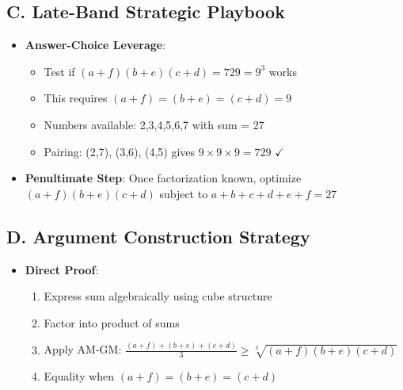 \documentclass[]{article}
\begin{document}
\begin{strategicbox}
\subsection*{C. Late-Band Strategic Playbook}
\begin{itemize}[leftmargin=*]
    \item \textbf{Answer-Choice Leverage}: 
    \begin{itemize}
        \item Test if $(a+f)(b+e)(c+d) = 729 = 9^3$ works
        \item This requires $(a+f) = (b+e) = (c+d) = 9$
        \item Numbers available: 2,3,4,5,6,7 with sum = 27
        \item Pairing: (2,7), (3,6), (4,5) gives $9 \times 9 \times 9 = 729$ $\checkmark$
    \end{itemize}
    \item \textbf{Penultimate Step}: Once factorization known, optimize $(a+f)(b+e)(c+d)$ subject to $a+b+c+d+e+f=27$
\end{itemize}

\subsection*{D. Argument Construction Strategy}
\begin{itemize}[leftmargin=*]
    \item \textbf{Direct Proof}: 
    \begin{enumerate}
        \item Express sum algebraically using cube structure
        \item Factor into product of sums
        \item Apply AM-GM: $\frac{(a+f)+(b+e)+(c+d)}{3}\geq\sqrt[3]{(a+f)(b+e)(c+d)}$
        \item Equality when $(a+f) = (b+e) = (c+d)$
    \end{enumerate}
\end{itemize}
\end{strategicbox}
\end{document}
